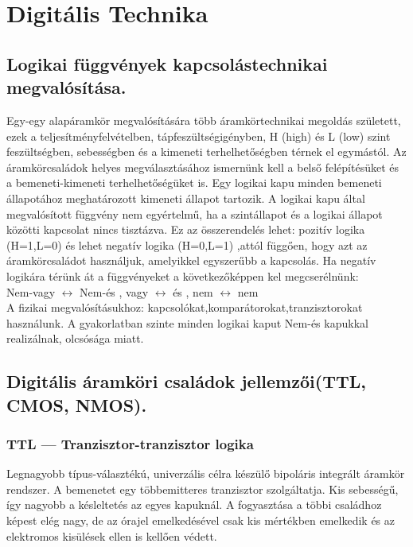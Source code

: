 \section{Digitális Technika}
\subsection{Logikai függvények kapcsolástechnikai megvalósítása.}
Egy-egy alapáramkör megvalósítására több áramkörtechnikai megoldás született, ezek a teljesítményfelvételben, tápfeszültségigényben, H (high) és L (low) szint feszültségben, sebességben és a kimeneti terhelhetőségben térnek el egymástól. Az áramkörcsaládok helyes megválasztásához ismernünk kell a belső felépítésüket és a bemeneti-kimeneti terhelhetőségüket is. Egy logikai kapu minden bemeneti állapotához meghatározott kimeneti állapot tartozik. A logikai kapu által megvalósított függvény nem egyértelmű, ha a szintállapot és a logikai állapot közötti kapcsolat nincs tisztázva. Ez az összerendelés lehet: pozitív logika (H=1,L=0) és lehet negatív logika (H=0,L=1) ,attól függően, hogy azt az áramkörcsaládot használjuk, amelyikkel egyszerűbb a kapcsolás. Ha negatív logikára térünk át a függvényeket a következőképpen kel megcserélnünk:\\
Nem-vagy $\leftrightarrow$ Nem-és , vagy $\leftrightarrow$ és , nem $\leftrightarrow$ nem\\ 
A fizikai megvalósításukhoz: kapcsolókat,komparátorokat,tranzisztorokat használunk. A gyakorlatban szinte minden logikai kaput Nem-és kapukkal realizálnak, olcsósága miatt.

\subsection{Digitális áramköri családok jellemzői(TTL, CMOS, NMOS).}
\subsubsection{TTL --- Tranzisztor-tranzisztor logika}
Legnagyobb típus-választékú, univerzális célra készülő bipoláris integrált áramkör rendszer. A bemenetet egy többemitteres tranzisztor szolgáltatja. Kis sebességű, így nagyobb a késleltetés az egyes kapuknál. A fogyasztása a többi családhoz képest elég nagy, de az órajel emelkedésével csak kis mértékben emelkedik és az elektromos kisülések ellen is kellően védett. 

